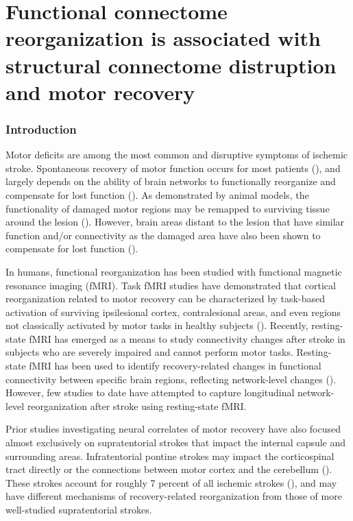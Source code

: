 \documentclass[phd,tocprelim]{cornell}
\begin{document}
\chapter{Functional connectome reorganization is associated with structural connectome distruption and motor recovery}
%
\subsection*{Introduction}
Motor deficits are among the most common and disruptive symptoms of ischemic stroke. Spontaneous recovery of motor function occurs for most patients (\cite{Duncan2000-uj}), and largely depends on the ability of brain networks to functionally reorganize and compensate for lost function (\cite{Grefkes2008-bt, Rehme2013-ap}). As demonstrated by animal models, the functionality of damaged motor regions may be remapped to surviving tissue around the lesion (\cite{Winship2009-af}). However, brain areas distant to the lesion that have similar function and/or connectivity as the damaged area have also been shown to compensate for lost function (\cite{Winship2009-af, Adam2020-jk, Murata2015-ss, Brown2009-jn}).
	
	In humans, functional reorganization has been studied with functional magnetic resonance imaging (fMRI). Task fMRI studies have demonstrated that cortical reorganization related to motor recovery can be characterized by task-based activation of surviving ipsilesional cortex, contralesional areas, and even regions not classically activated by motor tasks in healthy subjects (\cite{Ward2003-zd}). Recently, resting-state fMRI has emerged as a means to study connectivity changes after stroke in subjects who are severely impaired and cannot perform motor tasks. Resting-state fMRI has been used to identify recovery-related changes in functional connectivity between specific brain regions, reflecting network-level changes (\cite{Park2011-kx}). However, few studies to date have attempted to capture longitudinal network-level reorganization after stroke using resting-state fMRI. 
	
	Prior studies investigating neural correlates of motor recovery have also focused almost exclusively on supratentorial strokes that impact the internal capsule and surrounding areas.  Infratentorial pontine strokes may impact the corticospinal tract directly or the connections between motor cortex and the cerebellum (\cite{Lu2011-ow}). These strokes  account for roughly 7 percent of all ischemic strokes (\cite{Saia2009-ik}), and may have different mechanisms of recovery-related reorganization from those of more well-studied supratentorial strokes.
	
\end{document}
